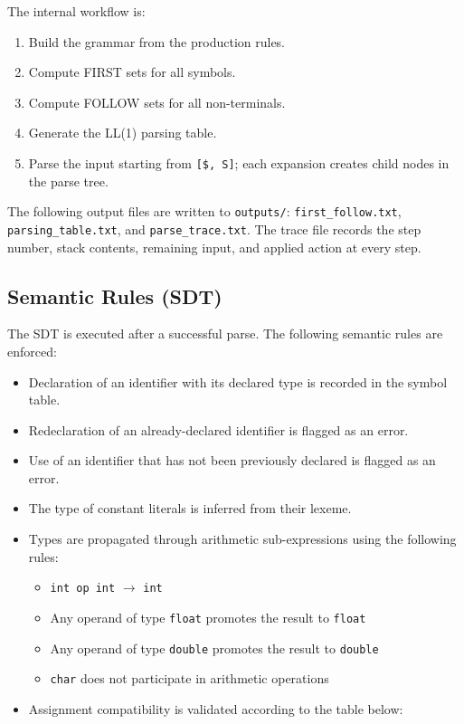 \documentclass[letterpaper,12pt,oneside]{article}
\begin{document}
The internal workflow is:
\begin{enumerate}
    \item Build the grammar from the production rules.
    \item Compute FIRST sets for all symbols.
    \item Compute FOLLOW sets for all non-terminals.
    \item Generate the LL(1) parsing table.
    \item Parse the input starting from \texttt{[\$, S]}; each expansion creates
          child nodes in the parse tree.
\end{enumerate}

The following output files are written to \texttt{outputs/}:
\texttt{first\_follow.txt}, \texttt{parsing\_table.txt}, and \texttt{parse\_trace.txt}.
The trace file records the step number, stack contents, remaining input, and applied
action at every step.

\subsection{Semantic Rules (SDT)}

The SDT is executed after a successful parse. The following semantic rules are
enforced:

\begin{itemize}
    \item Declaration of an identifier with its declared type is recorded in the
          symbol table.
    \item Redeclaration of an already-declared identifier is flagged as an error.
    \item Use of an identifier that has not been previously declared is flagged as
          an error.
    \item The type of constant literals is inferred from their lexeme.
    \item Types are propagated through arithmetic sub-expressions using the
          following rules:
          \begin{itemize}
              \item \texttt{int op int} $\rightarrow$ \texttt{int}
              \item Any operand of type \texttt{float} promotes the result to \texttt{float}
              \item Any operand of type \texttt{double} promotes the result to \texttt{double}
              \item \texttt{char} does not participate in arithmetic operations
          \end{itemize}
    \item Assignment compatibility is validated according to the table below:
\end{itemize}
\end{document}
